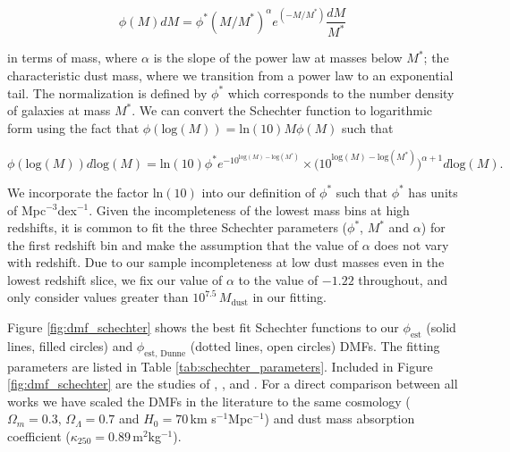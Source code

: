 \begin{equation}
    \phi(M) dM = \phi^* (M/M^*)^\alpha e^{(-M/M^*)}\frac{dM}{M^*}
    \label{eq:schechter_function}
\end{equation}

\noindent in terms of mass, where $\alpha$ is the slope of the power law at masses below $M^*$; the characteristic dust mass, where we transition from a power law to an exponential tail. The normalization is defined by $\phi^*$ which corresponds to the number density of galaxies at mass $M^*$. We can convert the Schechter function to logarithmic form using the fact that $\phi(\textrm{log}(M)) = \textrm{ln}(10)M\phi(M)$ such that

\begin{equation}
    \phi(\textrm{log}(M)) d\textrm{log}(M) = \textrm{ln}(10)\phi^* e^{-10^{\textrm{log}(M)-\textrm{log}(M^*)}}\times \Bigg(10^{\textrm{log}(M)-\textrm{log}(M^*)}\Bigg)^{\alpha+1} d\textrm{log}(M).
    \label{eq:schechter_function_log}
\end{equation}

We incorporate the factor $\textrm{ln}(10)$ into our definition of $\phi^*$ such that $\phi^*$ has units of Mpc$^{-3}$dex$^{-1}$. Given the incompleteness of the lowest mass bins at high redshifts, it is common to fit the three Schechter parameters ($\phi^*$, $M^*$ and $\alpha$) for the first redshift bin and make the assumption that the value of $\alpha$ does not vary with redshift. Due to our sample incompleteness at low dust masses even in the lowest redshift slice, we fix our value of $\alpha$ to the \citealt{Beeston_2018} value of $-1.22$ throughout, and only consider values greater than $10^{7.5}\,M_{\textrm{dust}}$ in our fitting.

Figure \ref{fig:dmf_schechter} shows the best fit Schechter functions to our $\phi_{\textrm{est}}$ (solid lines, filled circles) and $\phi_{\textrm{est, Dunne}}$ (dotted lines, open circles) DMFs. The fitting parameters are listed in Table \ref{tab:schechter_parameters}. Included in Figure \ref{fig:dmf_schechter} are the studies of \citealt{Vlahakis_2005}, \citealt{Dunne_2011}, \citealt{Beeston_2018} and \citealt{Pozzi_2020}. For a direct comparison between all works we have scaled the DMFs in the literature to the same cosmology ($\Omega_m = 0.3$, $\Omega_\Lambda = 0.7$ and $H_0 = 70\,$km s$^{-1}$Mpc$^{-1}$) and dust mass absorption coefficient ($\kappa_{250} = 0.89\,$m$^{2}$kg$^{-1}$).

